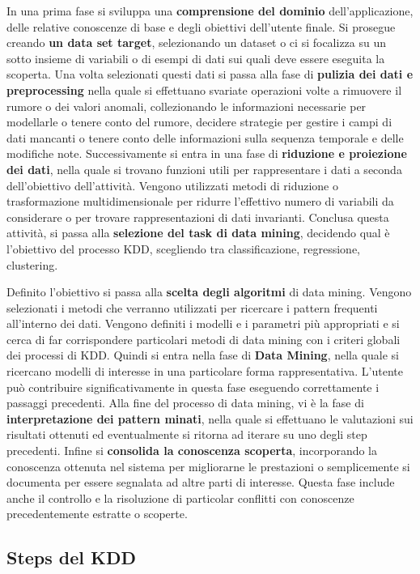 \documentclass[a4paper]{extarticle}
\begin{document}
In una prima fase si sviluppa una \textbf{comprensione del dominio} dell'applicazione, delle relative conoscenze di base e degli obiettivi dell'utente finale. Si prosegue creando \textbf{un data set target}, selezionando un dataset o ci si focalizza su un sotto insieme di variabili o di esempi di dati sui quali deve essere eseguita la scoperta. Una volta selezionati questi dati si passa alla fase di \textbf{pulizia dei dati e preprocessing} nella quale si effettuano svariate operazioni volte a rimuovere il rumore o dei valori anomali, collezionando le informazioni necessarie per modellarle o tenere conto del rumore, decidere strategie per gestire i campi di dati mancanti o tenere conto delle informazioni sulla sequenza temporale e delle modifiche note. Successivamente si entra in una fase di \textbf{riduzione e proiezione dei dati}, nella quale si trovano funzioni utili per rappresentare i dati a seconda dell'obiettivo dell'attività. Vengono utilizzati metodi di riduzione o trasformazione multidimensionale per ridurre l'effettivo numero di variabili da considerare o per trovare rappresentazioni di dati invarianti. Conclusa questa attività, si passa alla \textbf{selezione del task di data mining}, decidendo qual è l'obiettivo del processo KDD, scegliendo tra classificazione, regressione, clustering. 

Definito l'obiettivo si passa alla \textbf{scelta degli algoritmi} di data mining. Vengono selezionati i metodi che verranno utilizzati per ricercare i pattern frequenti all'interno dei dati. Vengono definiti i modelli e i parametri più appropriati e si cerca di far corrispondere particolari metodi di data mining con i criteri globali dei processi di KDD. Quindi si entra nella fase di \textbf{Data Mining}, nella quale si ricercano modelli di interesse in una particolare forma rappresentativa.  L'utente può contribuire significativamente in questa fase eseguendo correttamente i passaggi precedenti. Alla fine del processo di data mining, vi è la fase di \textbf{interpretazione dei pattern minati}, nella quale si effettuano le valutazioni sui risultati ottenuti ed eventualmente si ritorna ad iterare su uno degli step precedenti. Infine si \textbf{consolida la conoscenza scoperta}, incorporando la conoscenza ottenuta nel sistema per migliorarne le prestazioni o semplicemente si documenta per essere segnalata ad altre parti di interesse. Questa fase include anche il controllo e la risoluzione di particolar conflitti con conoscenze precedentemente estratte o scoperte.

\subsection{Steps del KDD}
\end{document}
